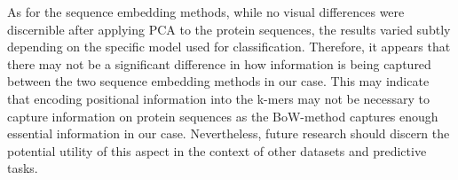 As for the sequence embedding methods, while no visual differences were discernible after applying PCA to the protein sequences, the results varied subtly depending on the specific model used for classification. Therefore, it appears that there may not be a significant difference in how information is being captured between the two sequence embedding methods in our case. This may indicate that encoding positional information into the k-mers may not be necessary to capture information on protein sequences as the BoW-method captures enough essential information in our case. Nevertheless, future research should discern the potential utility of this aspect in the context of other datasets and predictive tasks.
